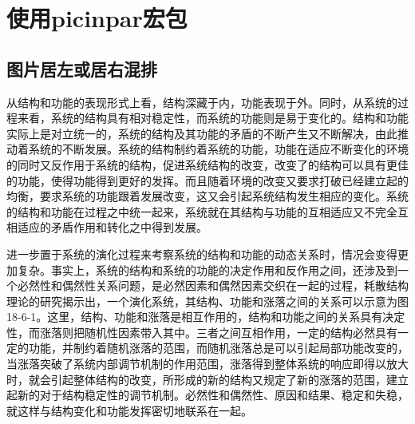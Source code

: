 \documentclass{article}
\begin{document}
\section{使用picinpar宏包}


\subsection{图片居左或居右混排}
从结构和功能的表现形式上看，结构深藏于内，功能表现于外。同时，从系统的过程来看，系统的结构具有相对稳定性，而系统的功能则是易于变化的。结构和功能实际上是对立统一的，系统的结构及其功能的矛盾的不断产生又不断解决，由此推动着系统的不断发展。系统的结构制约着系统的功能，功能在适应不断变化的环境的同时又反作用于系统的结构，促进系统结构的改变，改变了的结构可以具有更佳的功能，使得功能得到更好的发挥。而且随着环境的改变又要求打破已经建立起的均衡，要求系统的功能跟着发展改变，这又会引起系统结构发生相应的变化。系统的结构和功能在过程之中统一起来，系统就在其结构与功能的互相适应又不完全互相适应的矛盾作用和转化之中得到发展。

\begin{window}
  进一步置于系统的演化过程来考察系统的结构和功能的动态关系时，情况会变得更加复杂。事实上，系统的结构和系统的功能的决定作用和反作用之间，还涉及到一个必然性和偶然性关系问题，是必然因素和偶然因素交织在一起的过程，耗散结构理论的研究揭示出，一个演化系统，其结构、功能和涨落之间的关系可以示意为图18-6-1。这里，结构、功能和涨落是相互作用的，结构和功能之间的关系具有决定性，而涨落则把随机性因素带入其中。三者之间互相作用，一定的结构必然具有一定的功能，并制约着随机涨落的范围，而随机涨落总是可以引起局部功能改变的，当涨落突破了系统内部调节机制的作用范围，涨落得到整体系统的响应即得以放大时，就会引起整体结构的改变，所形成的新的结构又规定了新的涨落的范围，建立起新的对于结构稳定性的调节机制。必然性和偶然性、原因和结果、稳定和失稳，就这样与结构变化和功能发挥密切地联系在一起。
\end{window}
\end{document}
